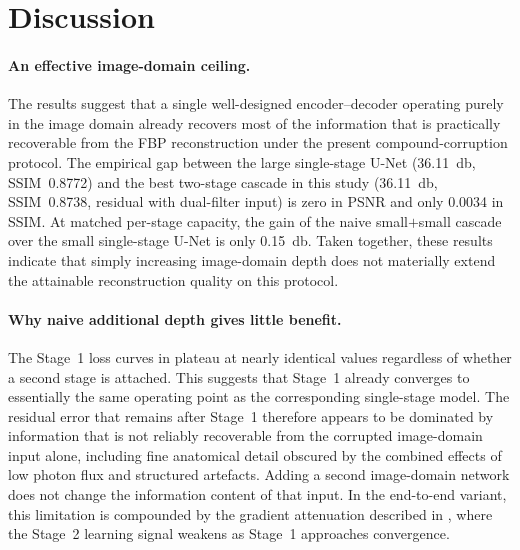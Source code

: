 \FloatBarrier
\section{Discussion}
\label{sec:exp_discussion}

\paragraph{An effective image-domain ceiling.}
The results suggest that a single well-designed encoder--decoder operating purely in the image domain already recovers most of the information that is practically recoverable from the FBP reconstruction under the present compound-corruption protocol. The empirical gap between the large single-stage U-Net (\SI{36.11}{\decibel}, SSIM~\num{0.8772}) and the best two-stage cascade in this study (\SI{36.11}{\decibel}, SSIM~\num{0.8738}, residual with dual-filter input) is zero in PSNR and only \num{0.0034} in SSIM. At matched per-stage capacity, the gain of the naive small$+$small cascade over the small single-stage U-Net is only \SI{0.15}{\decibel}. Taken together, these results indicate that simply increasing image-domain depth does not materially extend the attainable reconstruction quality on this protocol.

\paragraph{Why naive additional depth gives little benefit.}
The Stage~1 loss curves in  plateau at nearly identical values regardless of whether a second stage is attached. This suggests that Stage~1 already converges to essentially the same operating point as the corresponding single-stage model. The residual error that remains after Stage~1 therefore appears to be dominated by information that is not reliably recoverable from the corrupted image-domain input alone, including fine anatomical detail obscured by the combined effects of low photon flux and structured artefacts. Adding a second image-domain network does not change the information content of that input. In the end-to-end variant, this limitation is compounded by the gradient attenuation described in , where the Stage~2 learning signal weakens as Stage~1 approaches convergence.

